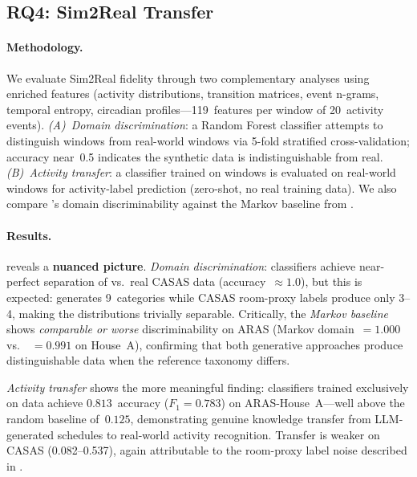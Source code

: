 \subsection{RQ4: Sim2Real Transfer}\label{sec:eval-rq4}

\paragraph{Methodology.}
We evaluate Sim2Real fidelity through two complementary analyses
using enriched features (activity distributions, transition matrices,
event n-grams, temporal entropy, circadian profiles---119~features
per window of 20~activity events).
\emph{(A)~Domain discrimination}: a Random Forest classifier
attempts to distinguish \sys{} windows from real-world windows
via 5-fold stratified cross-validation; accuracy near~0.5
indicates the synthetic data is indistinguishable from real.
\emph{(B)~Activity transfer}: a classifier trained on \sys{}
windows is evaluated on real-world windows for activity-label
prediction (zero-shot, no real training data).
We also compare \sys{}'s domain discriminability against the
Markov baseline from .

\paragraph{Results.}





 reveals a \textbf{nuanced picture}.
\emph{Domain discrimination}: classifiers achieve near-perfect
separation of \sys{} vs.\ real CASAS data (accuracy~$\approx 1.0$),
but this is expected: \sys{} generates 9~categories while CASAS
room-proxy labels produce only 3--4, making the distributions
trivially separable.  Critically, the \emph{Markov baseline} shows
\emph{comparable or worse} discriminability on ARAS
(Markov domain~$= 1.000$ vs.\ \sys{}~$= 0.991$ on House~A),
confirming that both generative approaches produce distinguishable
data when the reference taxonomy differs.

\emph{Activity transfer} shows the more meaningful finding:
classifiers trained exclusively on \sys{} data achieve
$0.813$~accuracy ($F_1 = 0.783$) on ARAS-House~A---well above
the random baseline of~$0.125$, demonstrating genuine knowledge
transfer from LLM-generated schedules to real-world activity
recognition.  Transfer is weaker on CASAS (0.082--0.537), again
attributable to the room-proxy label noise described in
.

